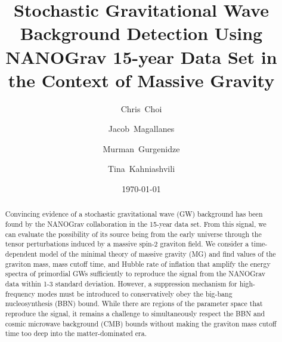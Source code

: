 \documentclass[prd,twocolumn,aps,psfig,nofootinbib,nobibnotes,superscriptaddress,preprintnumbers,times]{revtex4-2}
\begin{document}
\title{Stochastic Gravitational Wave Background Detection Using NANOGrav 15-year Data Set in the Context of Massive Gravity}

\date{\today}
\author{Chris~Choi}

\author{Jacob~Magallanes}

\author{Murman~Gurgenidze}

\author{Tina~Kahniashvili}

\begin{abstract}
Convincing evidence of a stochastic gravitational wave (GW) background has been found by the NANOGrav collaboration in the 15-year data set. From this signal, we can evaluate the possibility of its source being from the early universe through the tensor perturbations induced by a massive spin-2 graviton field. We consider a time-dependent model of the minimal theory of massive gravity (MG) and find values of the graviton mass, mass cutoff time, and Hubble rate of inflation that amplify the energy spectra of primordial GWs sufficiently to reproduce the signal from the NANOGrav data within 1-3 standard deviation. However, a suppression mechanism for high-frequency modes must be introduced to conservatively obey the big-bang nucleosynthesis (BBN) bound. While there are regions of the parameter space that reproduce the signal, it remains a challenge to simultaneously respect the BBN and cosmic microwave background (CMB) bounds without making the graviton mass cutoff time too deep into the matter-dominated era.
\end{abstract}
\end{document}
